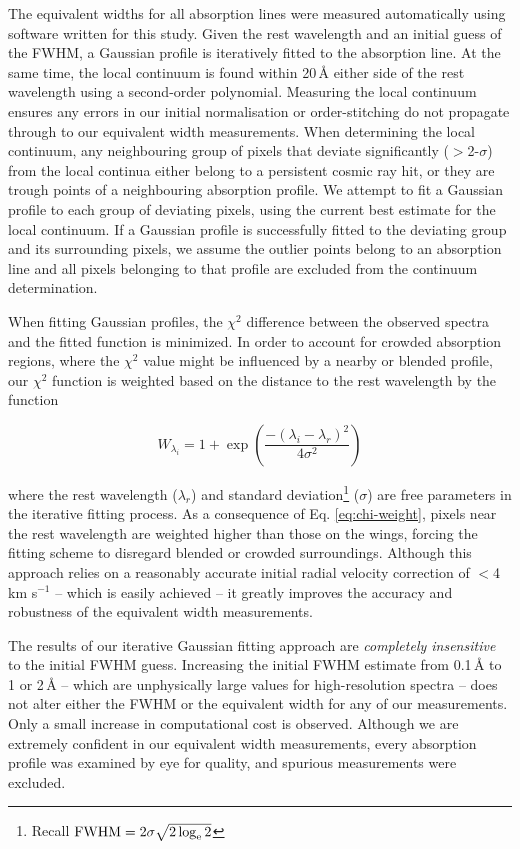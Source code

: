 \documentclass{emulateapj}
\begin{document}
The equivalent widths for all absorption lines were measured automatically using software written for this study. Given the rest wavelength and an initial guess of the FWHM, a Gaussian profile is iteratively fitted to the absorption line. At the same time, the local continuum is found within 20\,\AA{} either side of the rest wavelength using a second-order polynomial. Measuring the local continuum ensures any errors in our initial normalisation or order-stitching do not propagate through to our equivalent width measurements. When determining the local continuum, any neighbouring group of pixels that deviate significantly ($>$2-$\sigma$) from the local continua either belong to a persistent cosmic ray hit, or they are trough points of a neighbouring absorption profile. We attempt to fit a Gaussian profile to each group of deviating pixels, using the current best estimate for the local continuum. If a Gaussian profile is successfully fitted to the deviating group and its surrounding pixels, we assume the outlier points belong to an absorption line and all pixels belonging to that profile are excluded from the continuum determination. 

When fitting Gaussian profiles, the $\chi^2$ difference between the observed spectra and the fitted function is minimized. In order to account for crowded absorption regions, where the $\chi^2$ value might be influenced by a nearby or blended profile, our $\chi^2$ function is weighted based on the distance to the rest wavelength by the function

\begin{equation}
W_{\lambda_{i}} = 1 + \exp{\left(\frac{-(\lambda_{i} - \lambda_{r})^2}{4\sigma^2}\right)}
\label{eq:chi-weight}
\end{equation}

\noindent where the rest wavelength ($\lambda_{r}$) and standard deviation\footnote{Recall $\rm{FWHM} = 2\sigma\sqrt{2\log_e{2}}$} ($\sigma$) are free parameters in the iterative fitting process. As a consequence of Eq. \ref{eq:chi-weight}, pixels near the rest wavelength are weighted higher than those on the wings, forcing the fitting scheme to disregard blended or crowded surroundings. Although this approach relies on a reasonably accurate initial radial velocity correction of $<$4\,km s$^{-1}$ \--- which is easily achieved \--- it greatly improves the accuracy and robustness of the equivalent width measurements.

The results of our iterative Gaussian fitting approach are \textit{completely insensitive} to the initial FWHM guess. Increasing the initial FWHM estimate from 0.1\,\AA{} to 1 or 2\,\AA{} \--- which are unphysically large values for high-resolution spectra \--- does not alter either the FWHM or the equivalent width for any of our measurements. Only a small increase in computational cost is observed. Although we are extremely confident in our equivalent width measurements, every absorption profile was examined by eye for quality, and spurious measurements were excluded.
\end{document}
